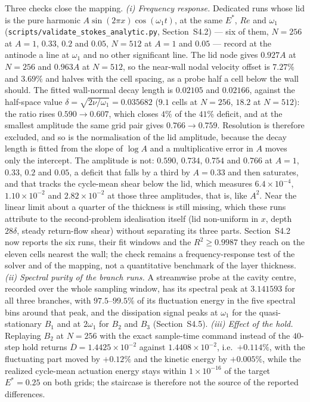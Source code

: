 \documentclass[11pt,a4paper]{article}
\newcommand{\brk}{\hspace{0pt}}
\begin{document}
Three checks close the mapping. \emph{(i) Frequency response.} Dedicated runs
whose lid is the pure harmonic $A\sin(2\pi x)\cos(\omega_1 t)$, at the same
$E^\ast$, $Re$ and $\omega_1$ (\texttt{scripts/validate\_stokes\_analytic\brk.py},
Section~S4.2) --- six of them, $N=256$ at $A=1$, $0.33$, $0.2$ and $0.05$,
$N=512$ at $A=1$ and $0.05$ --- record at the antinode a line at $\omega_1$ and no
other significant line. The lid node gives $0.927A$ at $N=256$ and $0.963A$ at
$N=512$, so the near-wall nodal velocity offset is $7.27\%$ and $3.69\%$ and
halves with the cell spacing, as a probe half a cell below the wall should. The
fitted wall-normal decay length is $0.02105$ and $0.02166$, against the half-space
value $\delta=\sqrt{2\nu/\omega_1}=0.035682$ ($9.1$ cells at $N=256$, $18.2$ at
$N=512$): the ratio rises $0.590\to0.607$, which closes $4\%$ of the $41\%$
deficit, and at the smallest amplitude the same grid pair gives $0.766\to0.759$.
Resolution is therefore excluded, and so is the normalisation of the lid
amplitude, because the decay length is fitted from the slope of $\log A$ and a
multiplicative error in $A$ moves only the intercept. The amplitude is not:
$0.590$, $0.734$, $0.754$ and $0.766$ at $A=1$, $0.33$, $0.2$ and $0.05$, a
deficit that falls by a third by $A=0.33$ and then saturates, and that tracks the
cycle-mean shear below the lid, which measures $6.4\times10^{-4}$,
$1.10\times10^{-2}$ and $2.82\times10^{-2}$ at those three amplitudes, that is,
like $A^2$. Near the linear limit about a quarter of the thickness is still
missing, which these runs attribute to the second-problem idealisation itself
(lid non-uniform in $x$, depth $28\delta$, steady return-flow shear) without
separating its three parts. Section~S4.2 now reports the six runs, their fit
windows and the $R^2\ge0.9987$ they reach on the eleven cells nearest the wall;
the check remains a frequency-response test of the solver and of the mapping, not
a quantitative benchmark of the layer thickness. \emph{(ii) Spectral purity of the
branch runs.} A streamwise probe at
the cavity centre, recorded over the whole sampling window, has its spectral peak
at $3.141593$ for all three branches, with $97.5$--$99.5\%$ of its fluctuation
energy in the five spectral bins around that peak, and the dissipation signal
peaks at $\omega_1$ for the quasi-stationary $B_1$ and at $2\omega_1$ for $B_2$
and $B_3$ (Section~S4.5). \emph{(iii) Effect of the hold.} Replaying $B_2$ at
$N=256$ with the exact sample-time command instead of the $40$-step hold returns
$\overline{D}=1.4425\times10^{-2}$ against $1.4408\times10^{-2}$, i.e.\
$+0.114\%$, with the fluctuating part moved by $+0.12\%$ and the kinetic energy
by $+0.005\%$, while the realized cycle-mean actuation energy stays within
$1\times10^{-16}$ of the target $E^\ast=0.25$ on both grids; the
staircase is therefore not the source of the reported differences.
\end{document}
